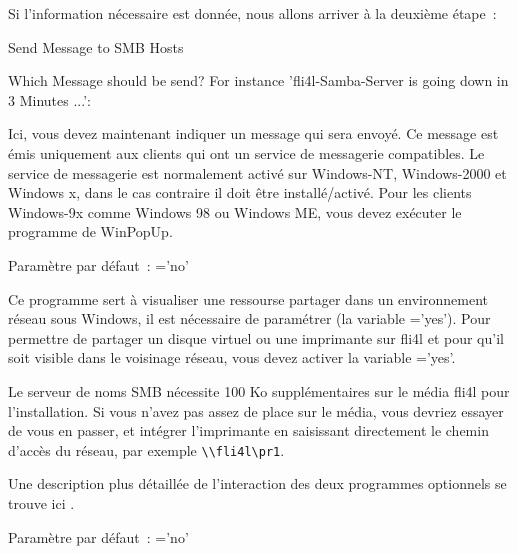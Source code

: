 \begin{enumerate}
Si l'information nécessaire est donnée, nous allons arriver à la deuxième étape~:

Send Message to SMB Hosts

Which Message should be send?
For instance 'fli4l-Samba-Server is going down in 3 Minutes ...':

Ici, vous devez maintenant indiquer un message qui sera envoyé. Ce message est
émis uniquement aux clients qui ont un service de messagerie compatibles. Le
service de messagerie est normalement activé sur Windows-NT, Windows-2000 et
Windows x, dans le cas contraire il doit être installé/activé.
Pour les clients Windows-9x comme Windows 98 ou Windows ME, vous devez exécuter
le programme de WinPopUp.

\end{enumerate}

    Paramètre par défaut~: ='no'



    Ce programme sert à visualiser une ressourse partager dans un environnement réseau
    sous Windows, il est nécessaire de paramétrer (la variable ='yes').
    Pour permettre  de partager un disque
    virtuel ou une imprimante sur fli4l et pour qu'il soit visible dans le voisinage
    réseau, vous devez activer la variable ='yes'.

    Le serveur de noms SMB nécessite 100 Ko supplémentaires sur le média fli4l
    pour l'installation. Si vous n'avez pas assez de place sur le média, vous
    devriez essayer de vous en passer, et intégrer l'imprimante en saisissant
	directement le chemin d'accès du réseau, par exemple \verb+\\fli4l\pr1+.

    Une description plus détaillée de l'interaction des deux programmes optionnels
    se trouve ici .

    Paramètre par défaut~: ='no'


